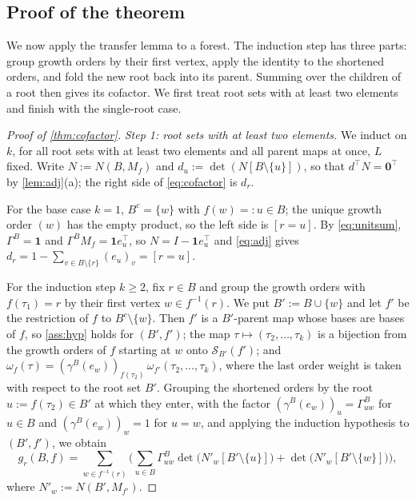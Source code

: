 \documentclass[onefignum,onetabnum,nohypdvips]{siamart250211}
\numberwithin{theorem}{section}
\numberwithin{equation}{section}
\newcommand{\Orders}{\mathcal{S}}
\newcommand{\one}{\mathbf{1}}
\newcommand{\zero}{\mathbf{0}}
\begin{document}
\subsection{Proof of the theorem}

We now apply the transfer lemma to a forest. The induction step has
three parts: group growth orders by their first vertex, apply the
identity to the shortened orders, and fold the new root back into its
parent. Summing over the children of a root then gives its cofactor.
We first treat root sets with at least two elements and finish with
the single-root case.

\begin{proof}[Proof of \cref{thm:cofactor}]
\emph{Step 1: root sets with at least two elements.} We induct on $k$, for all root sets with at
least two elements and all parent maps at once, $L$ fixed. Write
$N:=N(B,M_f)$ and $d_u:=\det(N[B\setminus\{u\}])$, so that
$d^{\top}N=\zero^{\top}$ by \cref{lem:adj}(a); the right side of
\eqref{eq:cofactor} is $d_r$.

For the base case $k=1$, $B^c=\{w\}$ with $f(w)=:u\in B$; the unique growth order
$(w)$ has the empty product, so the left side is $[r=u]$. By
\eqref{eq:unitsum}, $\Gamma^B=\one$ and $\Gamma^BM_f=\one e_{u}^{\top}$, so
$N=I-\one e_{u}^{\top}$ and \eqref{eq:adj} gives
$d_r=1-\sum_{v\in B\setminus\{r\}}(e_{u})_v=[r=u]$.

For the induction step $k\ge2$, fix $r\in B$ and group the growth orders with
$f(\tau_1)=r$ by their first vertex $w\in f^{-1}(r)$. We put
$B':=B\cup\{w\}$ and let $f'$ be the restriction of $f$ to
$B^c\setminus\{w\}$. Then $f'$ is a $B'$-parent map whose bases are
bases of $f$, so \cref{ass:hyp} holds for $(B',f')$; the map
$\tau\mapsto(\tau_2,\dots,\tau_k)$ is a bijection from the growth
orders of $f$ starting at $w$ onto $\Orders_{B'}(f')$; and
$\omega_f(\tau)=(\gamma^{B}(e_w))_{f(\tau_2)}\,\omega_{f'}(\tau_2,\dots,\tau_k)$,
where the last order weight is taken with respect to the root set $B'$.
Grouping the shortened orders by the root $u:=f(\tau_2)\in B'$ at which
they enter, with the factor $(\gamma^{B}(e_w))_u=\Gamma^B_{uw}$ for
$u\in B$ and $(\gamma^{B}(e_w))_w=1$ for $u=w$, and applying the
induction hypothesis to $(B',f')$, we obtain
\begin{equation}\label{eq:step1}
g_r(B,f)=\sum_{w\in f^{-1}(r)}\Big(\sum_{u\in B}
\Gamma^B_{uw}\det\big(N'_w[B'\setminus\{u\}]\big)
+\det\big(N'_w[B'\setminus\{w\}]\big)\Big),
\end{equation}
where $N'_w:=N(B',M_{f'})$.


\end{proof}
\end{document}
